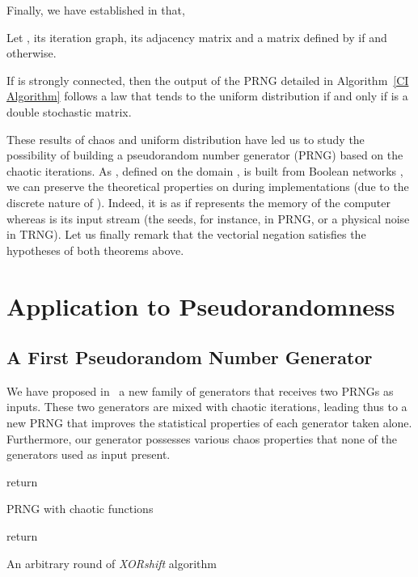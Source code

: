 \documentclass{article}
\begin{document}
Finally, we have established in \cite{bcgr11:ip} that,
\begin{theorem}
  Let ,  its
  iteration graph,  its adjacency
  matrix and 
  a  matrix defined by 
   if  and  
   otherwise.
  
  If  is strongly connected, then 
  the output of the PRNG detailed in Algorithm~\ref{CI Algorithm} follows 
  a law that tends to the uniform distribution 
  if and only if  is a double stochastic matrix.
\end{theorem} 


These results of chaos and uniform distribution have led us to study the possibility of building a
pseudorandom number generator (PRNG) based on the chaotic iterations. 
As , defined on the domain   , is built from Boolean networks , we can preserve the theoretical properties on 
during implementations (due to the discrete nature of ). Indeed, it is as if
 represents the memory of the computer whereas  is its input stream (the seeds, for instance, in PRNG, or a physical noise in TRNG).
Let us finally remark that the vectorial negation satisfies the hypotheses of both theorems above.

\section{Application to Pseudorandomness}
\label{sec:pseudorandom}

\subsection{A First Pseudorandom Number Generator}

We have proposed in~\cite{bgw09:ip} a new family of generators that receives 
two PRNGs as inputs. These two generators are mixed with chaotic iterations, 
leading thus to a new PRNG that improves the statistical properties of each
generator taken alone. Furthermore, our generator 
possesses various chaos properties that none of the generators used as input
present.

\begin{algorithm}[h!]
\;
\;
\For{}
{
\;
\;
}
return \;
\caption{PRNG with chaotic functions}
\label{CI Algorithm}
\end{algorithm}

\begin{algorithm}[h!]
\;
\;
\;
\;
return \;
\medskip
\caption{An arbitrary round of \textit{XORshift} algorithm}
\label{XORshift}
\end{algorithm}
\end{document}
